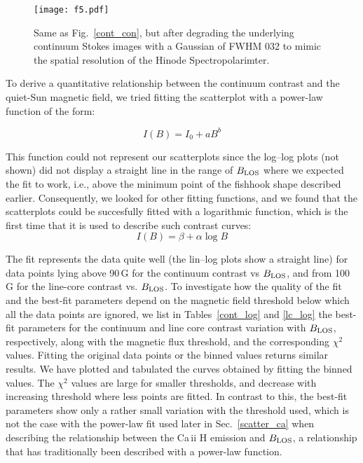 \documentclass[goettingen, gauss, print]{thesis}
\begin{document}
\begin{figure}
\centering
\texttt{[image: f5.pdf]}
\caption{Same as Fig.~\ref{cont_con}, but after degrading the underlying continuum Stokes images with a Gaussian of FWHM 0\carcsec{}32 to mimic the spatial resolution of the Hinode Spectropolarimter.}
\label{b_c_hinode}
\end{figure}


To derive a quantitative relationship between the continuum contrast and the quiet-Sun magnetic field, we tried fitting the scatterplot with a power-law function of the form: 

\begin{equation}
I(B) = I_0 + a B^b
\label{pl}
\end{equation}

This function could not represent our scatterplots since the log--log plots (not shown) did not display a straight line in the range of $B_{\rm LOS}$ where we expected the fit to work, i.e., above the minimum point of the fishhook shape described earlier. Consequently, we looked for other fitting functions, and we found that the scatterplots could be succesfully fitted with a logarithmic function, which is the first time that it is used to describe such contrast curves:
\begin{equation}
I(B) = \beta + \alpha \log B 
\label{log}
\end{equation}

The fit represents the data quite well (the lin--log plots show a straight line) for data points lying above 90\,G for the continuum contrast vs $B_{\rm LOS}$, and from 100\,G for the line-core contrast vs. $B_{\rm LOS}$.
To investigate how the quality of the fit and the best-fit parameters depend on the magnetic field threshold below which all the data points are ignored, we list in Tables~\ref{cont_log} and \ref{lc_log} the best-fit parameters for the continuum and line core contrast variation with $B_{\rm LOS}$, respectively, along with the magnetic flux threshold, and the corresponding $\chi^2$ values. Fitting the original data points or the binned values returns similar results. We have plotted and tabulated the curves obtained by fitting the binned values. The $\chi^2$ values are large for smaller thresholds, and decrease with increasing threshold where less points are fitted. In contrast to this, the best-fit parameters show only a rather small variation with the threshold used, which is not the case with the power-law fit used later in Sec.~\ref{scatter_ca} when describing the relationship between the Ca\,{\sc ii} H emission and $B_{\rm LOS}$, a relationship that has traditionally been described with a power-law function.
\end{document}
